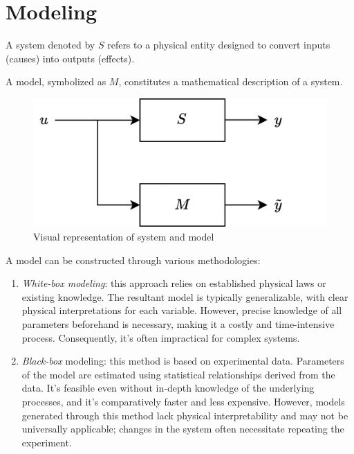 \section{Modeling}

\begin{definition}
    A system denoted by $S$ refers to a physical entity designed to convert inputs (causes) into outputs (effects).
\end{definition}
\begin{definition}
    A model, symbolized as $M$, constitutes a mathematical description of a system.
\end{definition}

\begin{figure}[H]
    \centering
    \includegraphics[width=0.5\linewidth]{images/model.png}
    \caption{Visual representation of system and model}
\end{figure}

A model can be constructed through various methodologies:
\begin{enumerate}
    \item \textit{White-box modeling}: this approach relies on established physical laws or existing knowledge. 
        The resultant model is typically generalizable, with clear physical interpretations for each variable.
        However, precise knowledge of all parameters beforehand is necessary, making it a costly and time-intensive process. 
        Consequently, it's often impractical for complex systems.
    \item \textit{Black-box} modeling: this method is based on experimental data. 
        Parameters of the model are estimated using statistical relationships derived from the data. 
        It's feasible even without in-depth knowledge of the underlying processes, and it's comparatively faster and less expensive. 
        However, models generated through this method lack physical interpretability and may not be universally applicable; changes in the system often necessitate repeating the experiment.
\end{enumerate}

